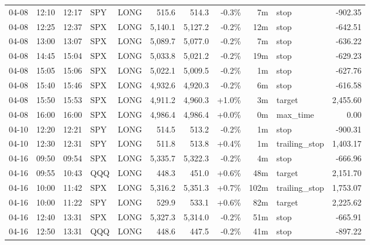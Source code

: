 \documentclass[11pt,a4paper,twoside]{article}
\begin{document}
\begin{center}
\begin{longtable}{>{\color{txtmain}}l l l l l r r r r >{\color{txtmain}}l r}
04-08 & 12:10 & 12:17 & SPY & LONG & 515.6 & 514.3 & \textcolor{lossred}{-0.3\%} & 7m & stop & \textcolor{lossred}{-902.35} \\
04-08 & 12:25 & 12:37 & SPX & LONG & 5,140.1 & 5,127.2 & \textcolor{lossred}{-0.2\%} & 12m & stop & \textcolor{lossred}{-642.51} \\
04-08 & 13:00 & 13:07 & SPX & LONG & 5,089.7 & 5,077.0 & \textcolor{lossred}{-0.2\%} & 7m & stop & \textcolor{lossred}{-636.22} \\
04-08 & 14:45 & 15:04 & SPX & LONG & 5,033.8 & 5,021.2 & \textcolor{lossred}{-0.2\%} & 19m & stop & \textcolor{lossred}{-629.23} \\
04-08 & 15:05 & 15:06 & SPX & LONG & 5,022.1 & 5,009.5 & \textcolor{lossred}{-0.2\%} & 1m & stop & \textcolor{lossred}{-627.76} \\
04-08 & 15:40 & 15:46 & SPX & LONG & 4,932.6 & 4,920.3 & \textcolor{lossred}{-0.2\%} & 6m & stop & \textcolor{lossred}{-616.58} \\
04-08 & 15:50 & 15:53 & SPX & LONG & 4,911.2 & 4,960.3 & \textcolor{wingreen}{+1.0\%} & 3m & target & \textcolor{wingreen}{2,455.60} \\
04-08 & 16:00 & 16:00 & SPX & LONG & 4,986.4 & 4,986.4 & \textcolor{wingreen}{+0.0\%} & 0m & max\_time & \textcolor{wingreen}{0.00} \\
04-10 & 12:20 & 12:21 & SPY & LONG & 514.5 & 513.2 & \textcolor{lossred}{-0.2\%} & 1m & stop & \textcolor{lossred}{-900.31} \\
04-10 & 12:30 & 12:31 & SPY & LONG & 511.8 & 513.8 & \textcolor{wingreen}{+0.4\%} & 1m & trailing\_stop & \textcolor{wingreen}{1,403.17} \\
04-16 & 09:50 & 09:54 & SPX & LONG & 5,335.7 & 5,322.3 & \textcolor{lossred}{-0.2\%} & 4m & stop & \textcolor{lossred}{-666.96} \\
04-16 & 09:55 & 10:43 & QQQ & LONG & 448.3 & 451.0 & \textcolor{wingreen}{+0.6\%} & 48m & target & \textcolor{wingreen}{2,151.70} \\
04-16 & 10:00 & 11:42 & SPX & LONG & 5,316.2 & 5,351.3 & \textcolor{wingreen}{+0.7\%} & 102m & trailing\_stop & \textcolor{wingreen}{1,753.07} \\
04-16 & 10:00 & 11:22 & SPY & LONG & 529.9 & 533.1 & \textcolor{wingreen}{+0.6\%} & 82m & target & \textcolor{wingreen}{2,225.62} \\
04-16 & 12:40 & 13:31 & SPX & LONG & 5,327.3 & 5,314.0 & \textcolor{lossred}{-0.2\%} & 51m & stop & \textcolor{lossred}{-665.91} \\
04-16 & 12:50 & 13:31 & QQQ & LONG & 448.6 & 447.5 & \textcolor{lossred}{-0.2\%} & 41m & stop & \textcolor{lossred}{-897.22} \\

\end{longtable}
\end{center}
\end{document}
